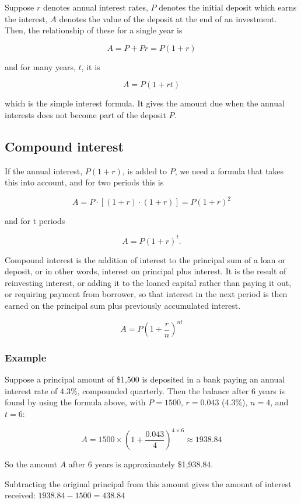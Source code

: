 Suppose \(r\) denotes annual interest rates, \(P\) denotes the initial deposit which earns the interest, \(A\) denotes the value of the deposit at the end of an investment. Then, the relationship of these for a single year is

\[
A=P+Pr=P(1+r)
\]

and for many years, \(t\), it is

\[
A=P(1+rt)
\]

which is the simple interest formula. It gives the amount due when the annual interests does not become part of the deposit \(P\).

\subsection{Compound interest}\label{compound-interest}

If the annual interest, \(P(1+r)\), is added to \(P\), we need a formula that takes this into account, and for two periods this is

\[
A=P\cdot  [(1+r)\cdot(1+r)]=P(1+r)^2
\]

and for t periods

\[
A=P(1+r)^t.
\]

Compound interest is the addition of interest to the principal sum of a loan or deposit, or in other words, interest on principal plus interest. It is the result of reinvesting interest, or adding it to the loaned capital rather than paying it out, or requiring payment from borrower, so that interest in the next period is then earned on the principal sum plus previously accumulated interest.

\[
A=P\left(1+\frac{r}{n}\right)^{nt}
\]


\subsubsection*{Example}\label{example}

Suppose a principal amount of \$1,500 is deposited in a bank paying an annual interest rate of 4.3\%, compounded quarterly. Then the balance after 6 years is found by using the formula above, with \(P = 1500\), \(r = 0.043\) (4.3\%), \(n = 4\), and \(t = 6\):

\[
A=1500\times\left(1+\frac{0.043}{4}\right)^{4\times 6}\approx 1938.84
\]

So the amount \(A\) after 6 years is approximately \$1,938.84.

Subtracting the original principal from this amount gives the amount of interest received: \(1938.84-1500=438.84\)

